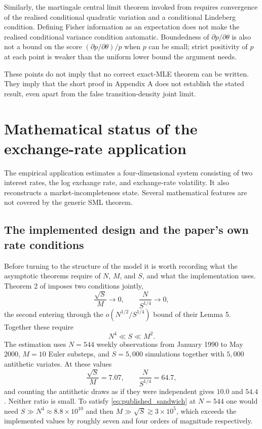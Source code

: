 \documentclass[11pt]{article}
\theoremstyle{definition}
\begin{document}
Similarly, the martingale central limit theorem invoked from \citet{HallHeyde1980} requires convergence of the realised conditional quadratic variation and a conditional Lindeberg condition. Defining Fisher information as an expectation does not make the realised conditional variance condition automatic. Boundedness of $\partial p/\partial\theta$ is also not a bound on the score $(\partial p/\partial\theta)/p$ when $p$ can be small; strict positivity of $p$ at each point is weaker than the uniform lower bound the argument needs.

These points do not imply that no correct exact-MLE theorem can be written. They imply that the short proof in Appendix A does not establish the stated result, even apart from the false transition-density joint limit.

\section{Mathematical status of the exchange-rate application}\label{sec:application}

The empirical application estimates a four-dimensional system consisting of two interest rates, the log exchange rate, and exchange-rate volatility. It also reconstructs a market-incompleteness state. Several mathematical features are not covered by the generic SML theorem.

\subsection{The implemented design and the paper's own rate conditions}\label{sec:design}

Before turning to the structure of the model it is worth recording what the asymptotic theorems require of $N$, $M$, and $S$, and what the implementation uses. Theorem 2 of \citet{BrandtSantaClara2002} imposes two conditions jointly,
\begin{equation}\label{eq:published_joint}
\frac{\sqrt S}{M}\longrightarrow0,
\qquad
\frac{N}{S^{1/4}}\longrightarrow0,
\end{equation}
the second entering through the $o(N^{1/2}/S^{1/4})$ bound of their Lemma 5. Together these require
\begin{equation}\label{eq:published_sandwich}
N^4\ll S\ll M^2 .
\end{equation}
The estimation uses $N=544$ weekly observations from January 1990 to May 2000, $M=10$ Euler substeps, and $S=5{,}000$ simulations together with $5{,}000$ antithetic variates. At these values
\[
\frac{\sqrt S}{M}=7.07,
\qquad
\frac{N}{S^{1/4}}=64.7,
\]
and counting the antithetic draws as if they were independent gives $10.0$ and $54.4$. Neither ratio is small. To satisfy \eqref{eq:published_sandwich} at $N=544$ one would need $S\gg N^4\approx8.8\times10^{10}$ and then $M\gg\sqrt S\gtrsim3\times10^5$, which exceeds the implemented values by roughly seven and four orders of magnitude respectively.
\end{document}
